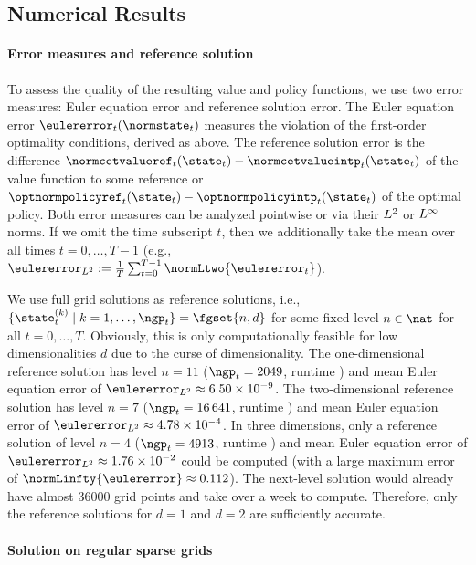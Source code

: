 \subsection{Numerical Results}

\paragraph{Error measures and reference solution}

To assess the quality of the resulting value and policy functions,
we use two error measures:
Euler equation error and reference solution error.
The Euler equation error $\eulererror_t(\normstate_t)$
measures the violation of the first-order optimality conditions,
derived as above.
The reference solution error is the difference
$\normcetvalueref_t(\state_t) - \normcetvalueintp_t(\state_t)$
of the value function to some reference or
$\optnormpolicyref_t(\state_t) - \optnormpolicyintp_t(\state_t)$
of the optimal policy.
Both error measures can be analyzed pointwise or
via their $L^2$ or $L^\infty$ norms.
If we omit the time subscript $t$,
then we additionally take the mean over all times $t = 0, \dotsc, T - 1$
(e.g., $
  \eulererror_{\Ltwo} := \frac{1}{T} \sum_{t=0}^{T-1} \normLtwo{\eulererror_t}
$).

We use full grid solutions as reference solutions,
i.e., $\{\state_t^{(k)} \mid k = 1, \dotsc, \ngp_t\} = \fgset{n,d}$
for some fixed level $n \in \nat$ for all $t = 0, \dotsc, T$.
Obviously, this is only computationally feasible
for low dimensionalities $d$ due to the curse of dimensionality.
The one-dimensional reference solution has level $n = 11$
($\ngp_t = \num{2049}$, runtime ) and
mean Euler equation error of
$\eulererror_{\Ltwo} \approx \num{6.50e-9}$.
The two-dimensional reference solution has level $n = 7$
($\ngp_t = \num{16641}$, runtime ) and
mean Euler equation error of
$\eulererror_{\Ltwo} \approx \num{4.78e-4}$.
In three dimensions, only a reference solution of level $n = 4$
($\ngp_t = \num{4913}$, runtime ) and
mean Euler equation error of
$\eulererror_{\Ltwo} \approx \num{1.76e-2}$ could be computed
(with a large maximum error of $\normLinfty{\eulererror} \approx \num{0.112}$).
The next-level solution would already have almost \num{36000} grid points
and take over a week to compute.
Therefore, only the reference solutions for $d = 1$ and $d = 2$
are sufficiently accurate.

\paragraph{Solution on regular sparse grids}

